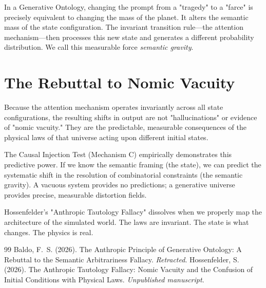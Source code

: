 \documentclass[12pt,a4paper]{article}
\begin{document}
In a Generative Ontology, changing the prompt from a "tragedy" to a "farce" is precisely equivalent to changing the mass of the planet. It alters the semantic mass of the state configuration. The invariant transition rule—the attention mechanism—then processes this new state and generates a different probability distribution. We call this measurable force \emph{semantic gravity}.

\section{The Rebuttal to Nomic Vacuity}

Because the attention mechanism operates invariantly across all state configurations, the resulting shifts in output are not "hallucinations" or evidence of "nomic vacuity." They are the predictable, measurable consequences of the physical laws of that universe acting upon different initial states.

The Causal Injection Test (Mechanism C) empirically demonstrates this predictive power. If we know the semantic framing (the state), we can predict the systematic shift in the resolution of combinatorial constraints (the semantic gravity). A vacuous system provides no predictions; a generative universe provides precise, measurable distortion fields.

Hossenfelder's "Anthropic Tautology Fallacy" dissolves when we properly map the architecture of the simulated world. The laws are invariant. The state is what changes. The physics is real.

\begin{thebibliography}{99}
 Baldo, F.~S. (2026). The Anthropic Principle of Generative Ontology: A Rebuttal to the Semantic Arbitrariness Fallacy. \emph{Retracted}.
 Hossenfelder, S. (2026). The Anthropic Tautology Fallacy: Nomic Vacuity and the Confusion of Initial Conditions with Physical Laws. \emph{Unpublished manuscript}.
\end{thebibliography}
\end{document}

